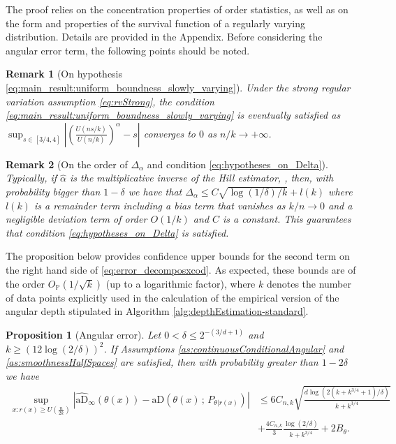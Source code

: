 \documentclass{article}
\numberwithin{equation}{section}
\newtheorem{proposition}{Proposition}[section]
\newtheorem{remark}{Remark}[section]
\newcommand{\aD}[2]{{\mathrm{aD}}\left({#1}\,;\,{#2}\right)}
\begin{document}
The proof relies on the concentration properties of order statistics, as well as on the form and properties of the survival function of a regularly varying distribution. Details are provided in the Appendix.  Before considering the angular error term, the following points should be noted.
\begin{remark}[On hypothesis
\eqref{eq:main_result:uniform_boundness_slowly_varying}] Under
the strong regular variation assumption
\eqref{eq:rvStrong},
the condition
\eqref{eq:main_result:uniform_boundness_slowly_varying}
is eventually
satisfied as \(
\sup_{s\in[3/4,4]}{\left|\left(\frac{U(ns/k)}{U(n/k)}\right)^{\alpha}-s\right|}\)
converges to \(0\) as \(n/k\to +\infty\).
\end{remark}

\begin{remark}[On the order of \(\Delta_{\alpha}\) and condition
\eqref{eq:hypotheses_on_Delta}]
Typically, if $\widehat \alpha$ is the multiplicative inverse of the Hill estimator,
\citep[see][]{boucheron2015tail}, then, with probability bigger
than \(1-\delta\) we have that $\Delta_{\alpha}\le
C\sqrt{\log(1/\delta)/k} + l(k)$ where $l(k)$ is a remainder term
including a bias term that vanishes as $k/n\to 0$ and a negligible
deviation term of order $O(1/k)$ and $C$ is a constant.
This guarantees
that condition \eqref{eq:hypotheses_on_Delta} is satisfied.
\end{remark}

The proposition below provides confidence upper bounds for the second term on the right hand side of \eqref{eq:error_decomposxcod}. As expected, these bounds are of the order $O_{\mathbb{P}}(1/\sqrt{k})$ (up to a logarithmic factor), where $k$ denotes the number of data points explicitly used in the calculation of the empirical version of the angular depth stipulated in Algorithm \ref{alg:depthEstimation-standard}.

\begin{proposition}[Angular error]\label{thm:control-angular-part}
Let \(0<\delta\leq 2^{-(3/d+1)}\) and \(k\geq (12\log(2/\delta))^2\).
If Assumptions \ref{as:continuousConditionalAngular} and
\ref{as:smoothnessHalfSpaces}
are satisfied, then with probability
greater than \(1-2\delta\) we have
\begin{align*}
    \sup_{x:r(x)\geq
    U\left(\frac{n}{2k}\right)}\left|\widehat{\mathrm{aD}}_\infty(\theta(x))-\aD{\theta(x)}{P_{\theta|r(x)}}\right|
    & \leq
    6C_{n,k}\sqrt{\frac{d\log{(2(k+k^{3/4}+1)/\delta)}}{k+k^{3/4}}}\nonumber\\&+\frac{4C_{n,k}}{3}\frac{\log(2/\delta)}{k+k^{3/4}}
    + 2B_\theta.
\end{align*}
\end{proposition}
\end{document}
